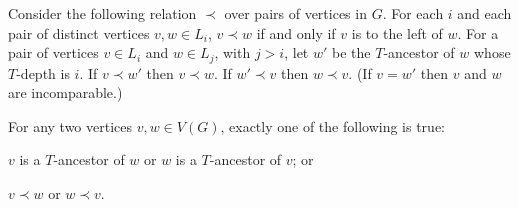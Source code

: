 \documentclass{patmorin}
\begin{document}
Consider the following relation $\prec$ over pairs of vertices in $G$. For each $i$ and each pair of distinct vertices $v,w\in L_i$, $v\prec w$ if and only if  $v$ is to the left of $w$.  For a pair of vertices $v\in L_i$ and $w\in L_j$, with $j>i$, let $w'$ be the $T$-ancestor of $w$ whose $T$-depth is $i$.  If $v\prec w'$ then $v\prec w$. If $w'\prec v$ then $w\prec v$. (If $v=w'$ then $v$ and $w$ are incomparable.)

%
%
%

\begin{obs}
  For any two vertices $v,w\in V(G)$, exactly one of the following is true:
  \begin{compactenum}
    \item $v$ is a $T$-ancestor of $w$ or $w$ is a $T$-ancestor of $v$; or
    \item $v\prec w$ or $w\prec v$.
  \end{compactenum}
\end{obs}

%
%
%
\end{document}
